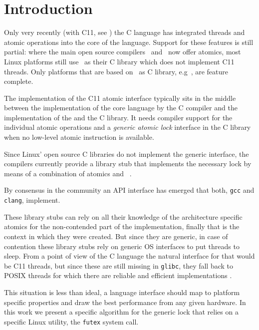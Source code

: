 
\section{Introduction}
\label{sec-1}

Only very recently (with C11, see \citeauthor{C11}) the C language has
integrated threads and atomic operations into the core of the
language.  Support for these features is still partial: where the
main open source compilers~\citeauthor{gcc} and~\citeauthor{clang} now offer atomics, most Linux
platforms still use~\citeauthor{glibc}
as their C library which does not implement C11 threads. Only
platforms that are based on~\citeauthor{musl} as C
library, e.g~\citeauthor{alpine}, are
feature complete.

The implementation of the C11 atomic interface typically sits in the
middle between the implementation of the core language
\iflong%
by the C compiler and the implementation of the
\else%
and the
\fi%
C library. It needs compiler support for the individual atomic operations
and a \emph{generic atomic lock} interface in the C library when no
low-level atomic instruction is available.


Since Linux' open source C libraries do not implement the generic
interface, the compilers currently provide a library stub that
implements the necessary lock by means of a combination of atomics
and~\citeauthor{POSIX2009}
.
\iflong%

By consensus in the community an API interface
has emerged that both, \texttt{gcc} and \texttt{clang}, implement.

These library stubs can rely on all their knowledge of the architecture
specific atomics for the non-contended part of the implementation, finally
that is the context in which they were created. But since
they are generic, in case of contention these
library stubs rely on generic OS interfaces to put threads to
sleep.
\fi%
From a point of view of the C language the natural interface
for that would be C11 threads,
but since these are still missing in \texttt{glibc}, they fall back to
POSIX threads%
\iflong%
for which there are reliable and efficient implementations%
\fi%
.

This situation is less than ideal, a language interface
should map to platform specific properties
and draw the best performance from any given hardware. In
this work we present a specific algorithm for the generic lock that
relies on a specific Linux utility, the \texttt{futex} system
call.

